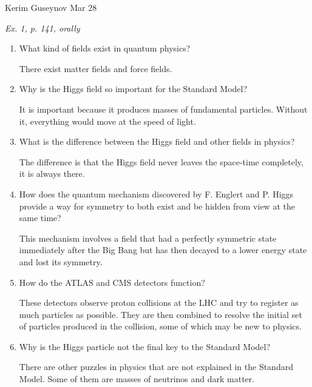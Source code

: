\documentclass[a4paper, 12pt]{article}
\begin{document}
\noindent
Kerim Guseynov
\hfill
Mar 28

\begin{center}
	\textit{Ex. 1, p. 141, orally}
\end{center}

\begin{enumerate}[label=\alph*)]
	\item What kind of fields exist in quantum physics?

		There exist matter fields and force fields.

	\item Why is the Higgs field so important for the Standard Model?

		It is important because it produces masses of fundamental particles. Without it, everything would move at the speed of light.

	\item What is the difference between the Higgs field and other fields in physics?

		The difference is that the Higgs field never leaves the space-time completely, it is always there.

	\item How does the quantum mechanism discovered by F. Englert and P. Higgs provide a way for symmetry to both exist and be hidden from view at the same time?

		This mechanism involves a field that had a perfectly symmetric state immediately after the Big Bang but has then decayed to a lower energy state and lost its symmetry.

	\item How do the ATLAS and CMS detectors function?

		These detectors observe proton collisions at the LHC and try to register as much particles as possible. They are then combined to resolve the initial set of particles produced in the collision, some of which may be new to physics.

	\item Why is the Higgs particle not the final key to the Standard Model?

		There are other puzzles in physics that are not explained in the Standard Model. Some of them are masses of neutrinos and dark matter.
\end{enumerate}
\end{document}
